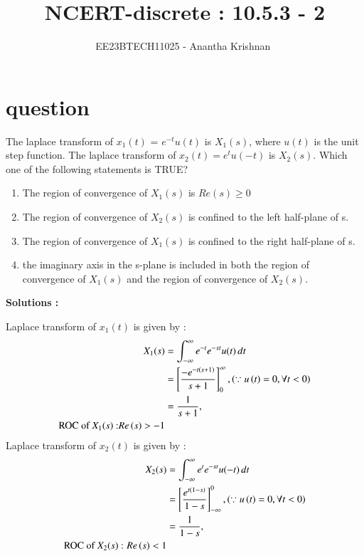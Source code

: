 \documentclass[journal,12pt,onecolumn]{IEEEtran}
\theoremstyle{remark}
\begin{document}

\vspace{3cm}

\title{NCERT-discrete : 10.5.3 - 2}
\author{EE23BTECH11025 - Anantha Krishnan $^{}$%
}
\maketitle
\bigskip



\section{question}

The laplace transform of $x_1(t)$ = $e^{-t}u(t)$ is $X_1(s)$, where $u(t)$ is the unit step function. The laplace transform of $x_2(t) = e^tu(-t)$ is $X_2(s)$. Which one of the following statements is TRUE?
\begin{enumerate}
    \item The region of convergence of $X_1(s)$ is $Re(s) \geq 0$
    \item The region of convergence of $X_2(s)$ is confined to the left half-plane of s.
    \item The region of convergence of $X_1(s)$ is confined to the right half-plane of s.
    \item the imaginary axis in the s-plane is included in both the region of convergence of $X_1(s)$ and the region of convergence of $X_2(s)$.
\end{enumerate}
 



\textbf{Solutions :}
    
Laplace transform of $x_1(t)$ is given by :
\begin{align}
    X_1(s) &=  \int_{-\infty}^{\infty} e^{-t}e^{-st}u(t) \,dt\\
       &=  \left[\frac{-e^{-t\left(s+1\right)}}{s+1}\right]_{0}^{\infty} , \left(\because u\left(t\right) =0 ,\forall t<0\right)\\ 
&= \frac{1}{s+1} , \\ \text{ROC of $X_1(s)$ :} Re\left(s\right) > -1
\end{align}
Laplace transform of $x_2(t)$ is given by :
\begin{align}
    X_2(s) &=  \int_{-\infty}^{\infty} e^{t}e^{-st}u(-t) \,dt\\
     &=  \left[\frac{e^{t\left(1-s\right)}}{1-s}\right]_{-\infty}^{0} , \left(\because u\left(t\right) =0 ,\forall t<0\right)\\
&= \frac{1}{1-s} , \\ \text{ROC of $X_2(s)$ : }Re\left(s\right) < 1
\end{align}
\end{document}
